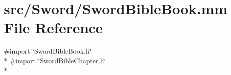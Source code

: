 \hypertarget{_sword_bible_book_8mm}{\section{src/\-Sword/\-Sword\-Bible\-Book.mm File Reference}
\label{_sword_bible_book_8mm}
}
{\ttfamily \#import \char`\"{}Sword\-Bible\-Book.\-h\char`\"{}}\\*
{\ttfamily \#import \char`\"{}Sword\-Bible\-Chapter.\-h\char`\"{}}\\*
